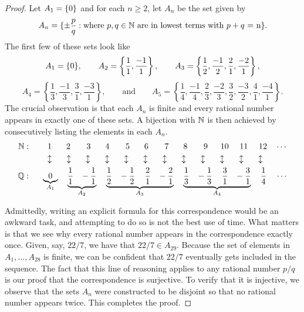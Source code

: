 \documentclass[11pt,twoside=off,numbers=noenddot]{scrbook}
\begin{document}
\begin{proof}
    Let $A_1 = \{ 0 \}$ and for each $n \geq 2$, let $A_n$ be the set given by
    \[ A_n = \{ \pm\frac{p}{q} : \text{where $p, q \in \mathbb N$ are in lowest terms with $p + q$ = n} \}. \]
    The first few of these sets look like
    \[ A_1 = \{ 0 \}, \qquad A_2 = \left\{\frac{1}{1}, \frac{-1}{1}\right\}, \qquad A_3 = \left\{\frac{1}{2}, \frac{-1}{2}, \frac{2}{1}, \frac{-2}{1}\right\}, \]
    \[ A_4 = \left\{\frac{1}{3}, \frac{-1}{3}, \frac{3}{1}, \frac{-3}{1}\right\}, \qquad \text{and} \qquad A_5 = \left\{\frac{1}{4}, \frac{-1}{4}, \frac{2}{3}, \frac{-2}{3}, \frac{3}{2}, \frac{-3}{2}, \frac{4}{1}, \frac{-4}{1}\right\}. \]
    The crucial observation is that each $A_n$ is finite and every rational number appears in exactly one of these sets. A bijection with $\mathbb N$ is then achieved by consecutively listing the elements in each $A_n$.
    \begin{align*}
        \mathbb N : \phantom{.}\quad & \;\;\, 1 \quad \phantom{-}2 \quad \phantom{''''}3 \quad \phantom{-}4 \quad \phantom{''''}5 \quad \phantom{-}6 \quad \phantom{''''}7 \quad \phantom{-}8 \quad \phantom{''''}9 \quad\:\,\, 10 \quad\,\, 11 \quad\,\, 12 \quad \cdots \\
        & \:\: \updownarrow \quad \phantom{.}\updownarrow \quad \phantom{.}\updownarrow \quad \phantom{.}\updownarrow \quad \phantom{.}\updownarrow \quad \phantom{.}\updownarrow \quad \phantom{.}\updownarrow \quad \phantom{.}\updownarrow \quad \phantom{.}\updownarrow \quad \phantom{.}\updownarrow \quad \phantom{.}\updownarrow \quad \phantom{.}\updownarrow \\
        \mathbb Q : \phantom{.}\quad & \underbrace{0}_{A_1} \quad \underbrace{\frac{1}{1} \,\,\,\,\, -\frac{1}{1}}_{A_2} \quad \underbrace{\frac{1}{2} \,\,\,\,\, -\frac{1}{2} \quad\, \frac{2}{1} \,\,\,\,\, -\frac{2}{1}}_{A_3} \quad \underbrace{\frac{1}{3} \,\,\,\,\, -\frac{1}{3} \quad\, \frac{3}{1} \,\,\,\,\, -\frac{3}{1}}_{A_4} \quad \frac{1}{4} \:\:\:\:\: \cdots
    \end{align*}

    Admittedly, writing an explicit formula for this correspondence would be an awkward task, and attempting to do so is not the best use of time. What matters is that we see why every rational number appears in the correspondence exactly once. Given, say, $22/7$, we have that $22/7 \in A_{29}$. Because the set of elements in $A_1, \dots, A_{28}$ is finite, we can be confident that $22/7$ eventually gets included in the sequence. The fact that this line of reasoning applies to any rational number $p/q$ is our proof that the correspondence is surjective. To verify that it is injective, we observe that the sets $A_n$ were constructed to be disjoint so that no rational number appears twice. This completes the proof.
\end{proof}
\end{document}
